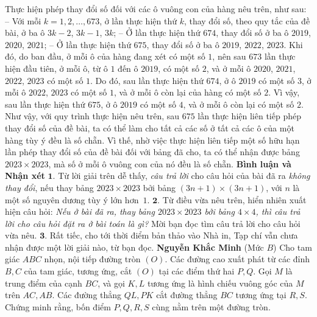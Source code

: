 \begin{multicols}{2}
	\vskip 0.05cm
	Thực hiện phép thay đổi số đối với các ô vuông con của hàng nêu trên, như sau:
	\vskip 0.05cm
	-- Với mỗi $k = 1, 2, \ldots, 673$, ở lần thực hiện thứ $k$, thay đổi số, theo quy tắc của đề bài, ở ba ô $3k - 2$, $3k - 1$, $3k$;
	\vskip 0.05cm
	-- Ở lần thực hiện thứ $674$, thay đổi số ở ba ô $2019$, $2020$, $2021$;
	\vskip 0.05cm
	-- Ở lần thực hiện thứ $675$, thay đổi số ở ba ô $2019$, $2022$, $2023$.
	\vskip 0.05cm
	Khi đó, do ban đầu, ở mỗi ô của hàng đang xét có một số $1$, nên sau $673$ lần thực hiện đầu tiên, ở mỗi ô, từ ô $1$ đến ô $2019$, có một số $2$, và ở mỗi ô $2020$, $2021$, $2022$, $2023$ có một số $1$. Do đó, sau lần thực hiện thứ $674$, ở ô $2019$ có một số $3$, ở mỗi ô $2022$, $2023$ có một số $1$, và ở mỗi ô còn lại của hàng có một số $2$. Vì vậy, sau lần thực hiện thứ $675$, ở ô $2019$ có một số $4$, và ở mỗi ô còn lại có một số $2$.
	\vskip 0.05cm
	Như vậy, với quy trình thực hiện nêu trên, sau $675$ lần thực hiện liên tiếp phép thay đổi số của đề bài, ta có thể làm cho tất cả các số ở tất cả các ô của một hàng tùy ý đều là số chẵn. Vì thế, nhờ việc thực hiện liên tiếp một số hữu hạn lần phép thay đổi số của đề bài đối với bảng đã cho, ta có thể nhận được bảng $2023 \times 2023$, mà số ở mỗi ô vuông con của nó đều là số chẵn.
	\vskip 0.05cm
	\textbf{\color{thachthuctoanhoc}Bình luận và Nhận xét}
	\vskip 0.05cm
	$\pmb{1.}$ Từ lời giải trên dễ thấy, \textit{câu trả lời} cho câu hỏi của bài đã ra \textit{không thay đổi}, nếu thay bảng $2023 \!\!\times\!\! 2023$ bởi bảng $(3n \!+\!\! 1\!) \!\!\times\!\! (3n \!+\!\! 1\!)$, với $n$ là một số nguyên dương tùy ý lớn hơn~$1$.
	\vskip 0.05cm
	$\pmb{2.}$ Từ điều vừa nêu trên, hiển nhiên xuất hiện câu hỏi: \textit{Nếu ở bài đã ra, thay bảng \linebreak$2023 \times 2023$ bởi bảng $4 \times 4$, thì câu trả lời cho câu hỏi đặt ra ở bài toán là gì?} Mời bạn đọc tìm câu trả lời cho câu hỏi vừa nêu.
	\vskip 0.05cm
	$\pmb{3.}$ Rất tiếc, cho tới thời điểm bản thảo vào Nhà in, Tạp chí vẫn chưa nhận được một lời giải nào, từ bạn đọc.
	\vskip 0.05cm
	\hfill\textbf{\color{thachthuctoanhoc}Nguyễn Khắc Minh}
	\vskip 0.05cm
	{}
	(Mức $B$) Cho tam giác $ABC$ nhọn, nội tiếp đường tròn $(O)$. Các đường cao xuất phát từ các đỉnh $B,C$ của tam giác, tương ứng, cắt $(O)$ tại các điểm thứ hai $P,Q$. Gọi $M$ là trung điểm của cạnh $BC$, và gọi $K, L$ tương ứng là hình chiếu vuông góc của $M$ trên $AC, A B$. Các đường thẳng $Q L, P K$ cắt đường thẳng $B C$ tương ứng tại $R, S$. Chứng minh rằng, bốn điểm $P, Q, R, S$ cùng nằm trên một đường tròn.

\end{multicols}
